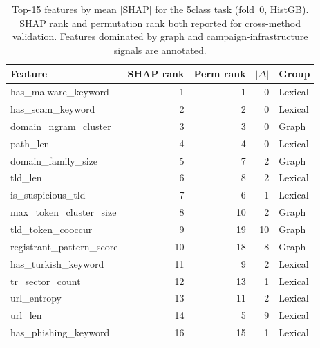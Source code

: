 \begin{table}[htbp]
\centering
\caption{Top-15 features by mean $|$SHAP$|$ for the 5class task (fold~0, HistGB). SHAP rank and permutation rank both reported for cross-method validation. Features dominated by graph and campaign-infrastructure signals are annotated.}
\label{tab:shap_top_5class}
\footnotesize
\begin{tabular}{lrrrl}
\toprule
Feature & SHAP rank & Perm rank & $|\Delta|$ & Group \\
\midrule
has\_malware\_keyword & 1 & 1 & 0 & Lexical \\
has\_scam\_keyword & 2 & 2 & 0 & Lexical \\
domain\_ngram\_cluster & 3 & 3 & 0 & Graph \\
path\_len & 4 & 4 & 0 & Lexical \\
domain\_family\_size & 5 & 7 & 2 & Graph \\
tld\_len & 6 & 8 & 2 & Lexical \\
is\_suspicious\_tld & 7 & 6 & 1 & Lexical \\
max\_token\_cluster\_size & 8 & 10 & 2 & Graph \\
tld\_token\_cooccur & 9 & 19 & 10 & Graph \\
registrant\_pattern\_score & 10 & 18 & 8 & Graph \\
has\_turkish\_keyword & 11 & 9 & 2 & Lexical \\
tr\_sector\_count & 12 & 13 & 1 & Lexical \\
url\_entropy & 13 & 11 & 2 & Lexical \\
url\_len & 14 & 5 & 9 & Lexical \\
has\_phishing\_keyword & 16 & 15 & 1 & Lexical \\
\bottomrule
\end{tabular}
\end{table}